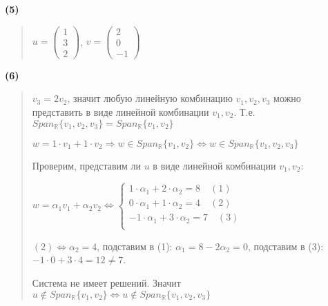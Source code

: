 \documentclass{article}
\begin{document}
\textbf{\textsf{(5)}}
\begin{quote}
    $u = \begin{pmatrix} 1 \\ 3 \\ 2 \end{pmatrix}$, 
    $v = \begin{pmatrix} 2 \\ 0 \\ -1 \end{pmatrix}$
\end{quote}

\textbf{\textsf{(6)}}
\begin{quote}
$v_3 = 2 v_2$, значит любую линейную комбинацию $v_1, v_2, v_3$ можно представить в виде 
линейной комбинации $v_1, v_2$. Т.е. $Span_{\mathbb{R}}\{v_1, v_2, v_3\} = Span_{\mathbb{R}}\{v_1, v_2 \}$

$w = 1 \cdot v_1 + 1 \cdot v_2 \Longrightarrow w \in Span_{\mathbb{R}}\{v_1, v_2 \} 
\Leftrightarrow \boxed{w \in Span_{\mathbb{R}}\{v_1, v_2, v_3 \}}$

Проверим, представим ли $u$ в виде линейной комбинации $v_1, v_2$:

$w = \alpha_1 v_1 + \alpha_2 v_2 \Leftrightarrow \begin{cases} 1 \cdot \alpha_1 + 2 \cdot \alpha_2 = 8 \quad (1) \\
    0 \cdot \alpha_1 + 1 \cdot \alpha_2 = 4 \quad (2)\\
    -1 \cdot \alpha_1 + 3 \cdot \alpha_2 = 7 \quad (3)\\
\end{cases}$ 

$(2) \Leftrightarrow \alpha_2 = 4$, подставим в (1): $\alpha_1 = 8 - 2 \alpha_2 = 0$, подставим в (3): $-1 \cdot 0 + 3 \cdot 4 = 12 \not = 7$. 

Система не имеет решений. Значит $u \not \in Span_{\mathbb{R}}\{v_1, v_2 \} \Leftrightarrow \boxed {u \not \in Span_{\mathbb{R}}\{v_1, v_2 , v_3\}}$ 




\end{quote}
\end{document}
